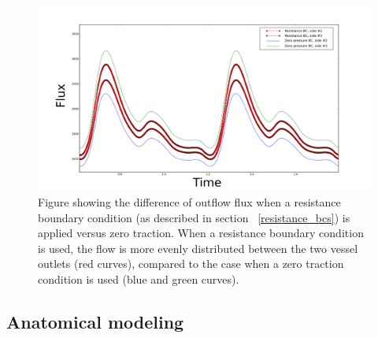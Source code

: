 \begin{figure}
  \center\includegraphics[width=\largefig]{chapters/kvs-2/png/zero_dp_vs_res.png}
    \caption{Figure showing the difference of outflow
    flux when a resistance boundary condition (as described in section
    ~\ref{resistance_bcs}) is applied versus zero traction. When a
    resistance boundary condition is used, the flow is more evenly
    distributed between the two vessel outlets (red curves), compared
    to the case when a zero traction condition is used (blue and green
    curves).}
  \label{fig:kvs-2:resistance_bcs_fig}
\end{figure}

\subsection{Anatomical modeling} \label{vmtk}

